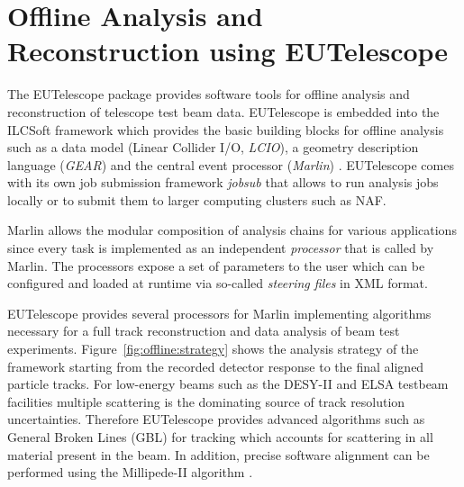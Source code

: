 \section{Offline Analysis and Reconstruction using EUTelescope}
\label{sec:offline}

The EUTelescope package \cite{Corrin2009} provides software tools for offline analysis and reconstruction of telescope test beam data. EUTelescope is embedded into the ILCSoft framework which provides the basic building blocks for offline analysis such as a data model (Linear Collider I/O, \emph{LCIO}), a geometry description language (\emph{GEAR}) and the central event processor (\emph{Marlin}) \cite{EUDET-2008-48}. EUTelescope comes with its own job submission framework \emph{jobsub} that allows to run analysis jobs locally or to submit them to larger computing clusters such as NAF.

Marlin allows the modular composition of analysis chains for various applications since every task is implemented as an independent \emph{processor} that is called by Marlin. The processors expose a set of parameters to the user which can be configured and loaded at runtime via so-called \emph{steering files} in XML format.

EUTelescope provides several processors for Marlin implementing algorithms necessary for a full track reconstruction and data analysis of beam test experiments. Figure~\ref{fig:offline:strategy} shows the analysis strategy of the framework starting from the recorded detector response to the final aligned particle tracks. 
For low-energy beams such as the DESY-II and ELSA testbeam facilities multiple scattering is the dominating source of track resolution uncertainties. Therefore EUTelescope provides advanced algorithms such as General Broken Lines (GBL) \cite{Kleinwort-2012} for tracking which accounts for scattering in all material present in the beam. In addition, precise software alignment can be performed using the Millipede-II algorithm \cite{Blobel-2006}.

